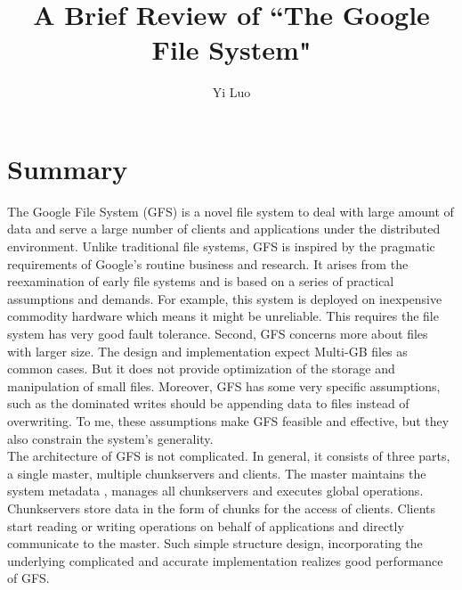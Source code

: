 \documentclass[10pt, letterpaper]{article}
\title{A Brief Review of ``The Google File System"}
\author{Yi Luo}
\date{} %
\begin{document}
\maketitle

\section{Summary}
\label{sec-summary}
The Google File System (GFS) is a novel file system to deal with large amount of data and serve a large number of clients and applications under the distributed environment. Unlike traditional file systems, GFS is inspired by the pragmatic requirements of Google's routine business and research. It arises from the reexamination of early file systems and is based on a series of practical assumptions and demands. For example, this system is deployed on inexpensive commodity hardware which means it might be unreliable. This requires the file system has very good fault tolerance. Second, GFS concerns more about files with larger size. The design and implementation expect Multi-GB files as common cases. But it does not provide optimization of the storage and manipulation of small files. Moreover, GFS has some very specific assumptions, such as the dominated writes should be appending data to files instead of overwriting. To me, these assumptions make GFS feasible and effective, but they also constrain the system's generality.
\\The architecture of GFS is not complicated. In general, it consists of three parts, a single master, multiple chunkservers and clients. The master maintains the system metadata , manages all chunkservers and executes global operations. Chunkservers store data in the form of chunks for the access of clients. Clients start reading or writing operations on behalf of applications and directly communicate to the master. Such simple structure design, incorporating the underlying complicated and accurate implementation realizes good performance of GFS.~\cite{ghemawat2003google}
\end{document}
